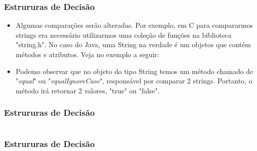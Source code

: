 \documentclass{beamer}
\begin{document}
\begin{frame}
	\frametitle{Estrururas de Decisão}
	\begin{itemize}
		\item Algumas comparações serão alteradas. Por exemplo, em C para compararmos strings era necessário utilizarmos uma coleção de funções na biblioteca "string.h". No caso do Java, uma String na verdade é um objetos que contém métodos e atributos. Veja no exemplo a seguir:
		\item Podemo observar que no objeto do tipo String temos um método chamado de "\textit{equal}" ou "\textit{equalIgnoreCase}", responsável por comparar 2 strings. Portanto, o método irá retornar 2 valores, "true" ou "false".
	\end{itemize}
\end{frame}
\begin{frame}
	\frametitle{Estrururas de Decisão}
	\begin{example}
		\inputminted[tabsize=1, fontsize=\footnotesize]{java}{codigos/ExemploIf04.java}
	\end{example}
\end{frame}
\begin{frame}
	\frametitle{Estrururas de Decisão}
	\begin{example}
		\inputminted[tabsize=1, fontsize=\footnotesize]{java}{codigos/ExemploIf05.java}
	\end{example}
\end{frame}
\end{document}
